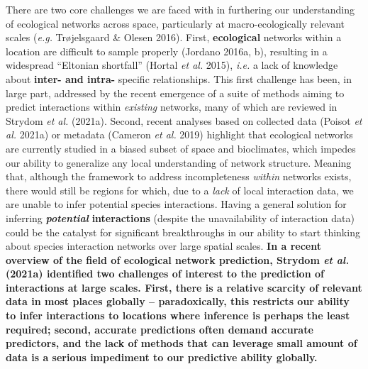 \documentclass[11pt]{article}
\makeatletter
\def\maxwidth{\ifdim\Gin@nat@width>\linewidth\linewidth
\else\Gin@nat@width\fi}
\let\Oldincludegraphics\includegraphics
\renewcommand{\includegraphics}[1]{\Oldincludegraphics[width=\maxwidth]{#1}}
\providecommand{\DIFaddtex}[1]{{\bf #1}} %
\providecommand{\DIFdeltex}[1]{} %
\providecommand{\DIFaddbegin}{\protect\color{blue}} %
\providecommand{\DIFaddend}{\protect\color{black}} %
\providecommand{\DIFdelbegin}{\protect\color{red}} %
\providecommand{\DIFdelend}{\protect\color{black}} %
\providecommand{\DIFadd}[1]{\texorpdfstring{\DIFaddtex{#1}}{#1}} %
\providecommand{\DIFdel}[1]{\texorpdfstring{\DIFdeltex{#1}}{}} %
\newcommand{\DIFscaledelfig}{0.5}
\newlength{\DIFdelgraphicswidth} %
\newlength{\DIFdelgraphicsheight} %
\newcommand{\DIFaddincludegraphics}[2][]{{\color{blue}\fbox{\DIFOincludegraphics[#1]{#2}}}} %
\newcommand{\DIFdelincludegraphics}[2][]{%
\sbox{\DIFdelgraphicsbox}{\DIFOincludegraphics[#1]{#2}}%
\settoboxwidth{\DIFdelgraphicswidth}{\DIFdelgraphicsbox} %
\settoboxtotalheight{\DIFdelgraphicsheight}{\DIFdelgraphicsbox} %
\scalebox{\DIFscaledelfig}{%
\parbox[b]{\DIFdelgraphicswidth}{\usebox{\DIFdelgraphicsbox}\\[-\baselineskip] \rule{\DIFdelgraphicswidth}{0em}}\llap{\resizebox{\DIFdelgraphicswidth}{\DIFdelgraphicsheight}{%
\setlength{\unitlength}{\DIFdelgraphicswidth}%
\begin{picture}(1,1)%
\thicklines\linethickness{2pt} %
{\color[rgb]{1,0,0}\put(0,0){\framebox(1,1){}}}%
{\color[rgb]{1,0,0}\put(0,0){\line( 1,1){1}}}%
{\color[rgb]{1,0,0}\put(0,1){\line(1,-1){1}}}%
\end{picture}%
}\hspace*{3pt}}} %
} %
\DeclareRobustCommand{\DIFaddbegin}{\DIFOaddbegin \let\includegraphics\DIFaddincludegraphics} %
\DeclareRobustCommand{\DIFaddend}{\DIFOaddend \let\includegraphics\DIFOincludegraphics} %
\DeclareRobustCommand{\DIFdelbegin}{\DIFOdelbegin \let\includegraphics\DIFdelincludegraphics} %
\DeclareRobustCommand{\DIFdelend}{\DIFOaddend \let\includegraphics\DIFOincludegraphics} %
\makeatother
\begin{document}
There are two core challenges we are faced with in furthering our
understanding of ecological networks across space, particularly at
macro-ecologically relevant scales (\emph{e.g.} Trøjelsgaard \& Olesen
2016). First, \DIFaddbegin \DIFadd{ecological }\DIFaddend networks within a location are difficult to
sample properly (Jordano 2016a, b), resulting in a widespread ``Eltonian
shortfall'' (Hortal \emph{et al.} 2015), \emph{i.e.} a lack of knowledge
about \DIFdelbegin \DIFdel{inter and intra }\DIFdelend \DIFaddbegin \DIFadd{inter- and intra- }\DIFaddend specific relationships. This first challenge has
been, in large part, addressed by the recent emergence of a suite of
methods aiming to predict interactions within \emph{existing} networks,
many of which are reviewed in Strydom \emph{et al.} (2021a). Second,
recent analyses based on collected data (Poisot \emph{et al.} 2021a) or
metadata (Cameron \emph{et al.} 2019) highlight that ecological networks
are currently studied in a biased subset of space and bioclimates, which
impedes our ability to generalize any local understanding of network
structure. Meaning that, although the framework to address
incompleteness \emph{within} networks exists, there would still be
regions for which, due to a \emph{lack} of local interaction data, we
are unable to infer potential species interactions. Having a general
solution for inferring \DIFdelbegin \DIFdel{a }\DIFdelend \emph{\DIFdelbegin \DIFdel{plausible}\DIFdelend \DIFaddbegin \DIFadd{potential}\DIFaddend } \DIFdelbegin \DIFdel{metaweb }\DIFdelend \DIFaddbegin \DIFadd{interactions }\DIFaddend (despite the
unavailability of interaction data) could be the catalyst for
significant breakthroughs in our ability to start thinking about species
interaction networks over large spatial scales. \DIFaddbegin \DIFadd{In a recent overview of
the field of ecological network prediction, Strydom \emph{et al.}
(2021a) identified two challenges of interest to the prediction of
interactions at large scales. First, there is a relative scarcity of
relevant data in most places globally -- paradoxically, this restricts
our ability to infer interactions to locations where inference is
perhaps the least required; second, accurate predictions often demand
accurate predictors, and the lack of methods that can leverage small
amount of data is a serious impediment to our predictive ability
globally.
}\DIFaddend 
\end{document}

